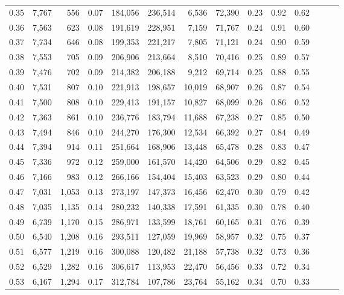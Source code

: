 \begin{tabular}{rrrrrrrrrrrrrr}
0.35 &  7,767 &    556 &  0.07 &  184,056 &  236,514 &   6,536 &  72,390 &  0.23 &  0.92 &      0.62 \\
0.36 &  7,563 &    623 &  0.08 &  191,619 &  228,951 &   7,159 &  71,767 &  0.24 &  0.91 &      0.60 \\
0.37 &  7,734 &    646 &  0.08 &  199,353 &  221,217 &   7,805 &  71,121 &  0.24 &  0.90 &      0.59 \\
0.38 &  7,553 &    705 &  0.09 &  206,906 &  213,664 &   8,510 &  70,416 &  0.25 &  0.89 &      0.57 \\
0.39 &  7,476 &    702 &  0.09 &  214,382 &  206,188 &   9,212 &  69,714 &  0.25 &  0.88 &      0.55 \\
0.40 &  7,531 &    807 &  0.10 &  221,913 &  198,657 &  10,019 &  68,907 &  0.26 &  0.87 &      0.54 \\
0.41 &  7,500 &    808 &  0.10 &  229,413 &  191,157 &  10,827 &  68,099 &  0.26 &  0.86 &      0.52 \\
0.42 &  7,363 &    861 &  0.10 &  236,776 &  183,794 &  11,688 &  67,238 &  0.27 &  0.85 &      0.50 \\
0.43 &  7,494 &    846 &  0.10 &  244,270 &  176,300 &  12,534 &  66,392 &  0.27 &  0.84 &      0.49 \\
0.44 &  7,394 &    914 &  0.11 &  251,664 &  168,906 &  13,448 &  65,478 &  0.28 &  0.83 &      0.47 \\
0.45 &  7,336 &    972 &  0.12 &  259,000 &  161,570 &  14,420 &  64,506 &  0.29 &  0.82 &      0.45 \\
0.46 &  7,166 &    983 &  0.12 &  266,166 &  154,404 &  15,403 &  63,523 &  0.29 &  0.80 &      0.44 \\
0.47 &  7,031 &  1,053 &  0.13 &  273,197 &  147,373 &  16,456 &  62,470 &  0.30 &  0.79 &      0.42 \\
0.48 &  7,035 &  1,135 &  0.14 &  280,232 &  140,338 &  17,591 &  61,335 &  0.30 &  0.78 &      0.40 \\
0.49 &  6,739 &  1,170 &  0.15 &  286,971 &  133,599 &  18,761 &  60,165 &  0.31 &  0.76 &      0.39 \\
0.50 &  6,540 &  1,208 &  0.16 &  293,511 &  127,059 &  19,969 &  58,957 &  0.32 &  0.75 &      0.37 \\
0.51 &  6,577 &  1,219 &  0.16 &  300,088 &  120,482 &  21,188 &  57,738 &  0.32 &  0.73 &      0.36 \\
0.52 &  6,529 &  1,282 &  0.16 &  306,617 &  113,953 &  22,470 &  56,456 &  0.33 &  0.72 &      0.34 \\
0.53 &  6,167 &  1,294 &  0.17 &  312,784 &  107,786 &  23,764 &  55,162 &  0.34 &  0.70 &      0.33 \\

\end{tabular}
